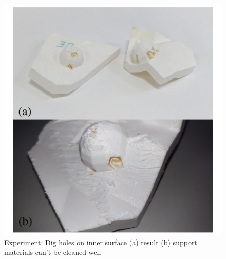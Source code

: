 \begin{figure}[ht]
\centering
\includegraphics[width=1.0\linewidth]{figs/dig_hole.pdf} 
\caption{Experiment: Dig holes on inner surface (a) result (b)  support materials can't be cleaned well}
\label{fig:exp_surface_dig}
\end{figure}

